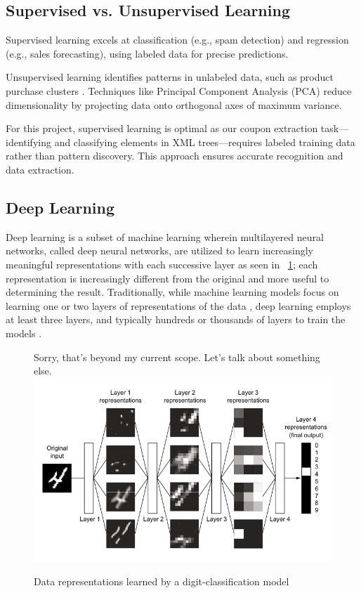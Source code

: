 \documentclass[licencjacka,en]{pracamgr}
\begin{document}

\subsection{Supervised vs. Unsupervised Learning}
Supervised learning excels at classification (e.g., spam detection) and regression (e.g., sales forecasting), using labeled data for precise predictions. 

Unsupervised learning identifies patterns in unlabeled data, such as product purchase clusters \cite{supervised_ibm}. Techniques like Principal Component Analysis (PCA) \cite{PCA} reduce dimensionality by projecting data onto orthogonal axes of maximum variance.

For this project, supervised learning is optimal as our coupon extraction task—identifying and classifying elements in XML trees—requires labeled training data rather than pattern discovery. This approach ensures accurate recognition and data extraction.

\subsection{Deep Learning}
Deep learning is a subset of machine learning wherein multilayered neural networks, called deep neural networks, are utilized to learn increasingly meaningful representations with each successive layer as seen in ~\ref{fig:nn_simple}; each representation is increasingly different from the original and more useful to determining the result. Traditionally, while machine learning models focus on learning one or two layers of representations of the data \cite{francuz_8}, deep learning employs at least three layers, and typically hundreds or thousands of layers to train the models \cite{ibm_dl}.

\begin{figure}Sorry, that's beyond my current scope. Let’s talk about something else.
    \centering
    \includegraphics[width=0.5\linewidth]{bachelor_images/nn_simple.png}
    \caption{Data representations learned by a digit-classification model \cite{francuz_8}}
    \label{fig:nn_simple}
\end{figure}
\end{document}
